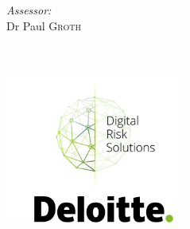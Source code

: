 \documentclass{article}
\newcommand{\red}[1]{{\color{red}{#1}}}
\begin{document}
\begin{titlepage}
\begin{minipage}[t]{0.4\textwidth}
\begin{flushright}
\emph{Assessor:} \\

Dr Paul \textsc{Groth}\\

\end{flushright}

\end{minipage}\\[2cm]








\begin{minipage}{\textwidth}
    \centering
    \includegraphics[height=5cm]{data/images/deloitte_thesis_cover6.png} %
\end{minipage}


 




\vfill %


\afterpage{\null\newpage}

\end{titlepage}
\end{document}
